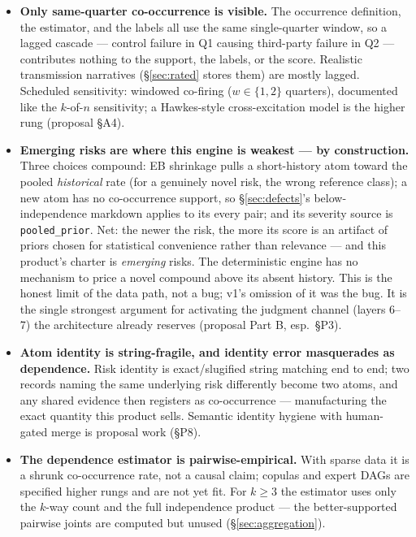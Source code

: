 \documentclass[11pt]{article}
\begin{document}
\begin{itemize}[leftmargin=1.4em]
\item \textbf{Only same-quarter co-occurrence is visible.} The occurrence
  definition, the estimator, and the labels all use the same single-quarter
  window, so a lagged cascade --- control failure in Q1 causing third-party
  failure in Q2 --- contributes nothing to the support, the labels, or the
  score. Realistic transmission narratives (\S\ref{sec:rated} stores them)
  are mostly lagged. Scheduled sensitivity: windowed co-firing
  ($w \in \{1, 2\}$ quarters), documented like the $k$-of-$n$ sensitivity;
  a Hawkes-style cross-excitation model is the higher rung (proposal
  \S A4).
\item \textbf{Emerging risks are where this engine is weakest --- by
  construction.} Three choices compound: EB shrinkage pulls a short-history
  atom toward the pooled \emph{historical} rate (for a genuinely novel
  risk, the wrong reference class); a new atom has no co-occurrence
  support, so \S\ref{sec:defects}'s below-independence markdown applies to
  its every pair; and its severity source is \texttt{pooled\_prior}. Net:
  the newer the risk, the more its score is an artifact of priors chosen
  for statistical convenience rather than relevance --- and this product's
  charter is \emph{emerging} risks. The deterministic engine has no
  mechanism to price a novel compound above its absent history. This is the
  honest limit of the data path, not a bug; v1's omission of it was the
  bug. It is the single strongest argument for activating the judgment
  channel (layers 6--7) the architecture already reserves (proposal Part B,
  esp.\ \S P3).
\item \textbf{Atom identity is string-fragile, and identity error
  masquerades as dependence.} Risk identity is exact/slugified string
  matching end to end; two records naming the same underlying risk
  differently become two atoms, and any shared evidence then registers as
  co-occurrence --- manufacturing the exact quantity this product sells.
  Semantic identity hygiene with human-gated merge is proposal work
  (\S P8).
\item \textbf{The dependence estimator is pairwise-empirical.} With sparse
  data it is a shrunk co-occurrence rate, not a causal claim; copulas and
  expert DAGs are specified higher rungs and are not yet fit. For
  $k \ge 3$ the estimator uses only the $k$-way count and the full
  independence product --- the better-supported pairwise joints are
  computed but unused (\S\ref{sec:aggregation}).
\end{itemize}
\end{document}
